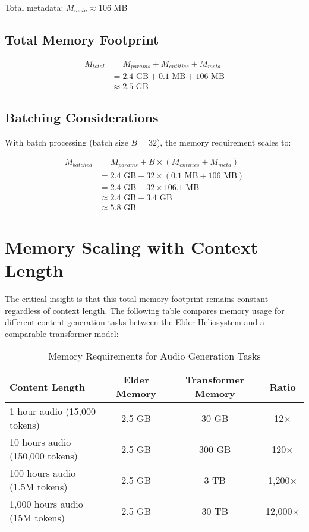 Total metadata: $M_{meta} \approx 106$ MB

\subsection{Total Memory Footprint}

\begin{align}
M_{total} &= M_{params} + M_{entities} + M_{meta} \\
&= 2.4 \text{ GB} + 0.1 \text{ MB} + 106 \text{ MB} \\
&\approx 2.5 \text{ GB}
\end{align}

\subsection{Batching Considerations}

With batch processing (batch size $B = 32$), the memory requirement scales to:

\begin{align}
M_{batched} &= M_{params} + B \times (M_{entities} + M_{meta}) \\
&= 2.4 \text{ GB} + 32 \times (0.1 \text{ MB} + 106 \text{ MB}) \\
&= 2.4 \text{ GB} + 32 \times 106.1 \text{ MB} \\
&\approx 2.4 \text{ GB} + 3.4 \text{ GB} \\
&\approx 5.8 \text{ GB}
\end{align}

\section{Memory Scaling with Context Length}

The critical insight is that this total memory footprint remains constant regardless of context length. The following table compares memory usage for different content generation tasks between the Elder Heliosystem and a comparable transformer model:

\begin{table}[h]
\centering
\begin{tabular}{|l|c|c|c|}
\hline
\textbf{Content Length} & \textbf{Elder Memory} & \textbf{Transformer Memory} & \textbf{Ratio} \\
\hline
1 hour audio (15,000 tokens) & 2.5 GB & 30 GB & 12× \\
10 hours audio (150,000 tokens) & 2.5 GB & 300 GB & 120× \\
100 hours audio (1.5M tokens) & 2.5 GB & 3 TB & 1,200× \\
1,000 hours audio (15M tokens) & 2.5 GB & 30 TB & 12,000× \\
\hline
\end{tabular}
\caption{Memory Requirements for Audio Generation Tasks}
\end{table}

